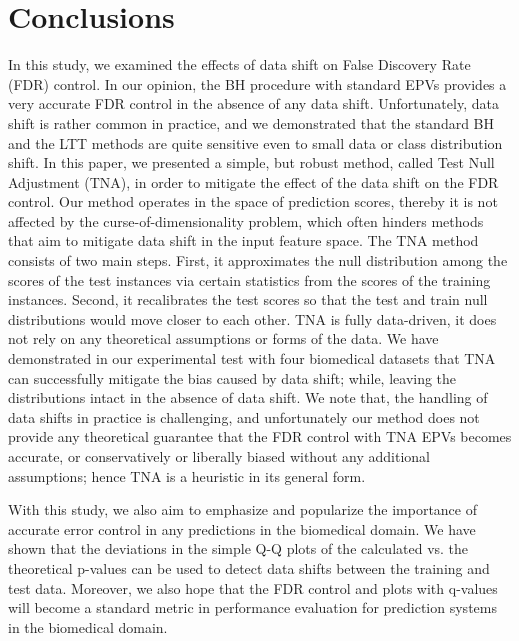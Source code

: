 \documentclass{article}
\begin{document}
\section{Conclusions}


In this study, we examined the effects of data shift on False Discovery Rate (FDR) control. In our opinion, the BH procedure with standard EPVs provides a very accurate FDR control in the absence of any data shift. Unfortunately, data shift is rather common in practice, and we demonstrated that the standard BH and the LTT methods are quite sensitive even to small data or class distribution shift. In this paper, we presented a simple, but robust method, called Test Null Adjustment (TNA), in order to mitigate the effect of the data shift on the FDR control. Our method operates in the space of prediction scores, thereby it is not affected by the curse-of-dimensionality problem, which often hinders methods that aim to mitigate data shift in the input feature space. The TNA method consists of two main steps. First, it approximates the null distribution among the scores of the test instances via certain statistics from the scores of the training instances. Second, it recalibrates the test scores so that the test and train null distributions would move closer to each other. TNA is fully data-driven, it does not rely on any theoretical assumptions or forms of the data. We have demonstrated in our experimental test with four biomedical datasets that TNA can successfully mitigate the bias caused by data shift; while, leaving the distributions intact in the absence of data shift. We note that, the handling of data shifts in practice is challenging, and unfortunately our method does not provide any theoretical guarantee that the FDR control with TNA EPVs becomes accurate, or conservatively or liberally biased without any additional assumptions; hence TNA is a heuristic in its general form.  

With this study, we also aim to emphasize and popularize the importance of accurate error control in any predictions in the biomedical domain. We have shown that the deviations in the simple Q-Q plots of the calculated vs. the theoretical p-values can be used to detect data shifts between the training and test data. Moreover, we also hope that the FDR control and plots with q-values will become a standard metric in performance evaluation for prediction systems in the biomedical domain.





\end{document}
